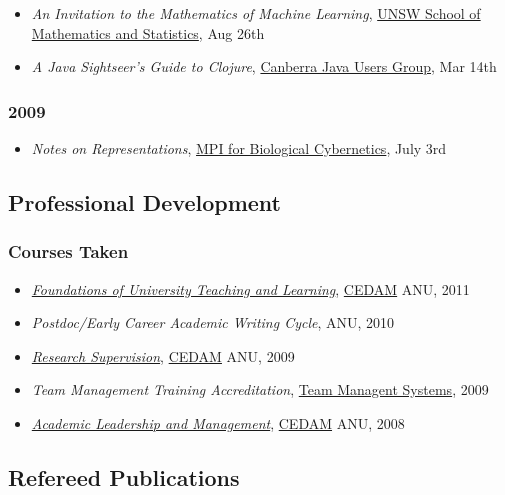 \documentclass{article}
\begin{document}
\begin{itemize}%
\item \emph{An Invitation to the Mathematics of Machine Learning}, \href{http://www.maths.unsw.edu.au/}{UNSW School of Mathematics and Statistics}, Aug 26th
\item \emph{A Java Sightseer'{}s Guide to Clojure}, \href{http://www.cjugaustralia.org/}{Canberra Java Users Group}, Mar 14th

\end{itemize}
\hypertarget{2009}{}\subsubsection*{{2009}}\label{2009}

\begin{itemize}%
\item \emph{Notes on Representations}, \href{http://www.kyb.mpg.de/}{MPI for Biological Cybernetics}, July 3rd

\end{itemize}
\hypertarget{professional_development}{}\subsection*{{Professional Development}}\label{professional_development}

\hypertarget{courses_taken}{}\subsubsection*{{Courses Taken}}\label{courses_taken}

\begin{itemize}%
\item \emph{\href{http://cedam.anu.edu.au/teaching-enrichment/foundations}{Foundations of University Teaching and Learning}}, \href{http://cedam.anu.edu.au/}{CEDAM} ANU, 2011
\item \emph{Postdoc/Early Career Academic Writing Cycle}, ANU, 2010
\item \emph{\href{http://researchsuper.cedam.anu.edu.au/}{Research Supervision}}, \href{http://cedam.anu.edu.au/}{CEDAM} ANU, 2009
\item \emph{Team Management Training Accreditation}, \href{http://www.tms.com.au/}{Team Managent Systems}, 2009
\item \emph{\href{http://cedam.anu.edu.au/career-development/academic-leadership-management}{Academic Leadership and Management}}, \href{http://cedam.anu.edu.au/}{CEDAM} ANU, 2008

\end{itemize}
\hypertarget{refereed_publications}{}\subsection*{{Refereed Publications}}\label{refereed_publications}
\end{document}

